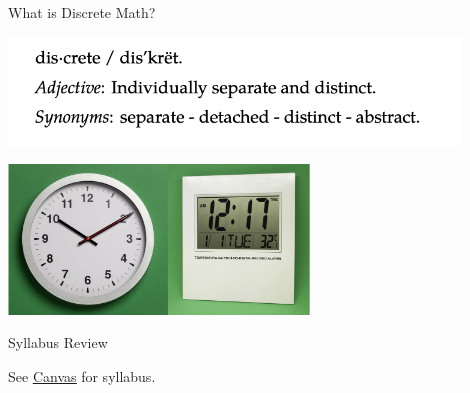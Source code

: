 \documentclass[10pt]{beamer}
\begin{document}
\begin{frame}{What is Discrete Math?}
\begin{center}
\includegraphics[width=0.9\textwidth]{images/what_is_discrete_math} \\
\end{center}
\pause 
\vspace{1cm}
\begin{center}
\includegraphics[width=0.6\textwidth]{images/clocks}
\end{center}
\end{frame}


\begin{frame}{Syllabus Review}

\Large \centering
See \color{blue} \underline{\href{https://montana.instructure.com/courses/20155/pages/home-page}{Canvas}} \color{black} for syllabus.

\end{frame}
\end{document}
